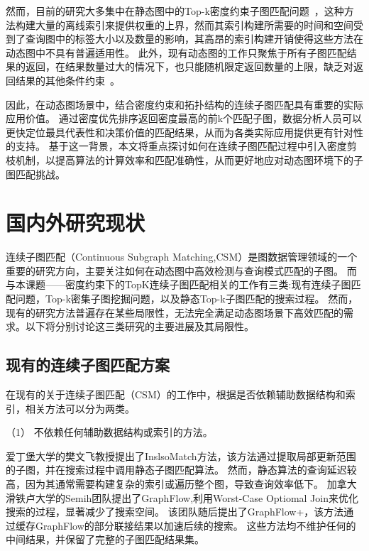 然而，目前的研究大多集中在静态图中的Top-k密度约束子图匹配问题~\cite{density-define-DBLP:journals/vldb/AngelKSSST14,dsm-noweight-Bahmani-DBLP:journals/pvldb/BahmaniKV12}，这种方法构建大量的离线索引来提供权重的上界，然而其索引构建所需要的时间和空间受到了查询图中的标签大小以及数量的影响，其高昂的索引构建开销使得这些方法在动态图中不具有普遍适用性。
此外，现有动态图的工作只聚焦于所有子图匹配结果的返回，在结果数量过大的情况下，也只能随机限定返回数量的上限，缺乏对返回结果的其他条件约束~\cite{csm-sjtree-DBLP:conf/edbt/ChoudhuryHCAF15,csm-IncIsoMatch-DBLP:conf/sigmod/FanLLTWW11,dsm-noweight-Hu-DBLP:conf/cikm/HuWC17,csm-turboflux-DBLP:conf/sigmod/KimSHLHCSJ18,csm-graphflowpp-DBLP:journals/tods/MhedhbiKS21,csm-symbi-DBLP:journals/pvldb/MinPPGIH21,csm-rapidflow-DBLP:journals/pvldb/SunSHL22}。

因此，在动态图场景中，结合密度约束和拓扑结构的连续子图匹配具有重要的实际应用价值。
通过密度优先排序返回密度最高的前k个匹配子图，数据分析人员可以更快定位最具代表性和决策价值的匹配结果，从而为各类实际应用提供更有针对性的支持。
基于这一背景，本文将重点探讨如何在连续子图匹配过程中引入密度剪枝机制，以提高算法的计算效率和匹配准确性，从而更好地应对动态图环境下的子图匹配挑战。
\section{国内外研究现状}
连续子图匹配（Continuous Subgraph Matching,CSM）是图数据管理领域的一个重要的研究方向，主要关注如何在动态图中高效检测与查询模式匹配的子图。
而与本课题——密度约束下的TopK连续子图匹配相关的工作有三类:现有连续子图匹配问题，Top-k密集子图挖掘问题，以及静态Top-k子图匹配的搜索过程。
然而，现有的研究方法普遍存在某些局限性，无法完全满足动态图场景下高效匹配的需求。以下将分别讨论这三类研究的主要进展及其局限性。
\subsection{现有的连续子图匹配方案}
在现有的关于连续子图匹配（CSM）的工作\cite{csm-sjtree-DBLP:conf/edbt/ChoudhuryHCAF15,csm-IncIsoMatch-DBLP:conf/sigmod/FanLLTWW11,csm-graphflow-DBLP:conf/sigmod/KankanamgeSMCS17,csm-turboflux-DBLP:conf/sigmod/KimSHLHCSJ18,csm-graphflowpp-DBLP:journals/tods/MhedhbiKS21,csm-symbi-DBLP:journals/pvldb/MinPPGIH21,csm-rapidflow-DBLP:journals/pvldb/SunSHL22}中，根据是否依赖辅助数据结构和索引，相关方法可以分为两类。

（1） 不依赖任何辅助数据结构或索引的方法。

爱丁堡大学的樊文飞教授提出了InslsoMatch\cite{csm-IncIsoMatch-DBLP:conf/sigmod/FanLLTWW11}方法，该方法通过提取局部更新范围的子图，并在搜索过程中调用静态子图匹配算法。
然而，静态算法的查询延迟较高，因为其通常需要构建复杂的索引或遍历整个图，导致查询效率低下。
加拿大滑铁卢大学的Semih团队提出了GraphFlow\cite{csm-graphflow-DBLP:conf/sigmod/KankanamgeSMCS17},利用Worst-Case Optiomal Join来优化搜索的过程，显著减少了搜索空间。
该团队随后提出了GraphFlow+\cite{csm-graphflowpp-DBLP:journals/tods/MhedhbiKS21}，该方法通过缓存GraphFlow的部分联接结果以加速后续的搜索。
这些方法均不维护任何的中间结果，并保留了完整的子图匹配结果集。

